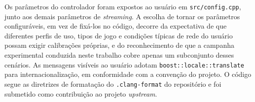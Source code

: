 Os parâmetros do controlador foram expostos ao usuário em
\texttt{src/config.cpp}, junto aos demais parâmetros de
\emph{streaming}. A escolha de tornar os parâmetros
configuráveis, em vez de fixá-los no código, decorre da
expectativa de que diferentes perfis de uso, tipos de jogo e
condições típicas de rede do usuário possam exigir calibrações
próprias, e do reconhecimento de que a campanha
experimental conduzida neste trabalho cobre apenas um
subconjunto desses cenários. As mensagens visíveis ao usuário
adotam \texttt{boost::locale::translate} para internacionalização,
em conformidade com a convenção do projeto. O código segue as
diretrizes de formatação do \texttt{.clang-format} do
repositório e foi submetido como contribuição ao projeto
\emph{upstream}.
